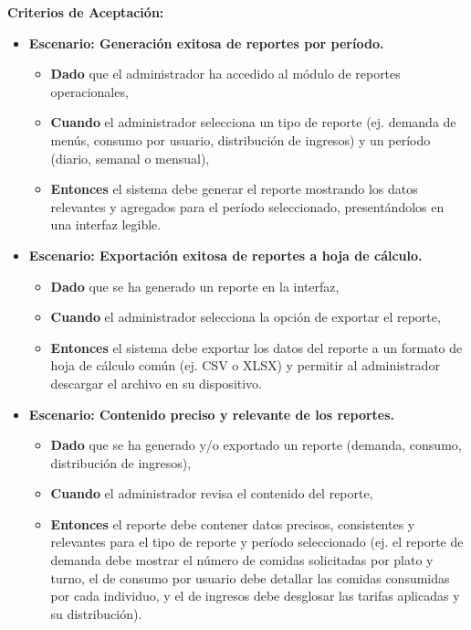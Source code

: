 \documentclass[12pt]{article}
\begin{document}
\textbf{Criterios de Aceptación:}
\begin{itemize}
	\item \textbf{Escenario: Generación exitosa de reportes por período.}
	\begin{itemize}
		\item \textbf{Dado} que el administrador ha accedido al módulo de reportes operacionales,
		\item \textbf{Cuando} el administrador selecciona un tipo de reporte (ej. demanda de menús, consumo por usuario, distribución de ingresos) y un período (diario, semanal o mensual),
		\item \textbf{Entonces} el sistema debe generar el reporte mostrando los datos relevantes y agregados para el período seleccionado, presentándolos en una interfaz legible.
	\end{itemize}

	\item \textbf{Escenario: Exportación exitosa de reportes a hoja de cálculo.}
	\begin{itemize}
		\item \textbf{Dado} que se ha generado un reporte en la interfaz,
		\item \textbf{Cuando} el administrador selecciona la opción de exportar el reporte,
		\item \textbf{Entonces} el sistema debe exportar los datos del reporte a un formato de hoja de cálculo común (ej. CSV o XLSX) y permitir al administrador descargar el archivo en su dispositivo.
	\end{itemize}

	\item \textbf{Escenario: Contenido preciso y relevante de los reportes.}
	\begin{itemize}
		\item \textbf{Dado} que se ha generado y/o exportado un reporte (demanda, consumo, distribución de ingresos),
		\item \textbf{Cuando} el administrador revisa el contenido del reporte,
		\item \textbf{Entonces} el reporte debe contener datos precisos, consistentes y relevantes para el tipo de reporte y período seleccionado (ej. el reporte de demanda debe mostrar el número de comidas solicitadas por plato y turno, el de consumo por usuario debe detallar las comidas consumidas por cada individuo, y el de ingresos debe desglosar las tarifas aplicadas y su distribución).
	\end{itemize}


\end{itemize}
\end{document}
